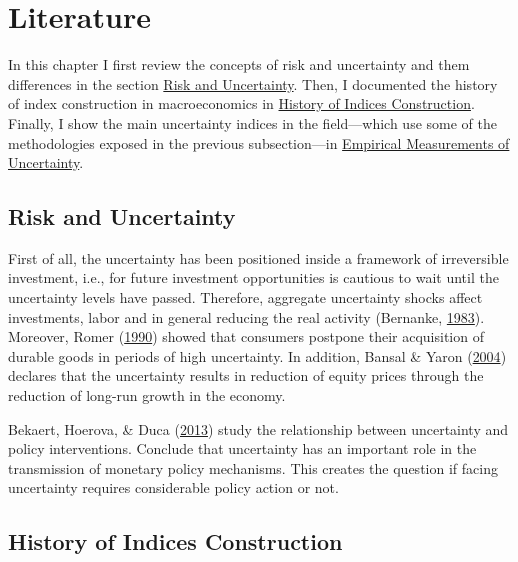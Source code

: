 \documentclass[12pt,twoside]{reedthesis}
\begin{document}
\hypertarget{literature}{%
\chapter{Literature}\label{literature}}

In this chapter I first review the concepts of risk and uncertainty and them differences in the section \protect\hyperlink{risk-and-uncertainty}{Risk and Uncertainty}. Then, I documented the history of index construction in macroeconomics in \protect\hyperlink{history-of-indices-construction}{History of Indices Construction}. Finally, I show the main uncertainty indices in the field---which use some of the methodologies exposed in the previous subsection---in \protect\hyperlink{empirical-measurements-of-uncertainty}{Empirical Measurements of Uncertainty}.

\hypertarget{risk-and-uncertainty}{%
\section{Risk and Uncertainty}\label{risk-and-uncertainty}}

First of all, the uncertainty has been positioned inside a framework of irreversible investment, i.e., for future investment opportunities is cautious to wait until the uncertainty levels have passed. Therefore, aggregate uncertainty shocks affect investments, labor and in general reducing the real activity (Bernanke, \protect\hyperlink{ref-bernanke:1983}{1983}). Moreover, Romer (\protect\hyperlink{ref-romer:1990}{1990}) showed that consumers postpone their acquisition of durable goods in periods of high uncertainty. In addition, Bansal \& Yaron (\protect\hyperlink{ref-bansyaro:2004}{2004}) declares that the uncertainty results in reduction of equity prices through the reduction of long-run growth in the economy.

Bekaert, Hoerova, \& Duca (\protect\hyperlink{ref-bekaetal:2013}{2013}) study the relationship between uncertainty and policy interventions. Conclude that uncertainty has an important role in the transmission of monetary policy mechanisms. This creates the question if facing uncertainty requires considerable policy action or not.

\hypertarget{history-of-indices-construction}{%
\section{History of Indices Construction}\label{history-of-indices-construction}}
\end{document}
